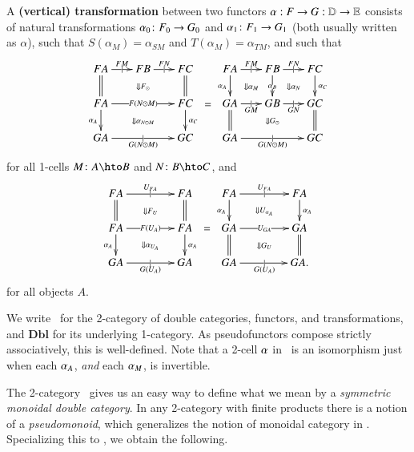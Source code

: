 \documentclass{amsart}
\begin{document}
\begin{defn}\label{thm:dbl-transf}
  A \textbf{(vertical) transformation} between two functors $\alpha:
  F\to G:\mathbb{D}\to\mathbb{E}$ consists of natural transformations $\alpha_0\colon
  F_0\to G_0$ and $\alpha_1\colon F_1\to G_1$ (both usually written as
  $\alpha$), such that $S(\alpha_{M}) = \alpha_{SM}$ and
  $T(\alpha_{M}) = \alpha_{TM}$, and such that
  \[\vcenter{\xymatrix@-.5pc{
      FA \ar@{=}[d] \ar[r]|{|}^{FM}
      \ar@{}[drr]|{\Downarrow F_\odot} &
      FB \ar[r]|{|}^{FN} &
      FC \ar@{=}[d]\\
      FA \ar[rr]|{F(N\odot M)} \ar[d]_{\alpha_A}
      \ar@{}[drr]|{\Downarrow \alpha_{N\odot M}} &&
      FC \ar[d]^{\alpha_C}\\
      GA \ar[rr]|{|}_{G(N\odot M)} && GC
    }} =
  \vcenter{\xymatrix@-.5pc{
      FA \ar[d]_{\alpha_A} \ar@{}[dr]|{\Downarrow \alpha_M} \ar[r]|{|}^{FM} &
      FB \ar[d]|{\alpha_B} \ar@{}[dr]|{\Downarrow \alpha_N} \ar[r]|{|}^{FN} &
      FC \ar[d]^{\alpha_C}\\
      GA \ar@{=}[d] \ar[r]|{|}_{GM} \ar@{}[drr]|{\Downarrow G_\odot} &
      GB \ar[r]|{|}_{GN} &
      GC \ar@{=}[d]\\
      GA \ar[rr]|{|}_{G(N\odot M)} && GC
    }}\]
  for all 1-cells $M\colon A\hto B$ and $N\colon B\hto C$, and
  \[\vcenter{\xymatrix@-.5pc{
      FA \ar[rr]|{|}^{U_{FA}} \ar@{=}[d]
      \ar@{}[drr]|{\Downarrow F_U} &&
      FA \ar@{=}[d]\\
      FA \ar[rr]|{F(U_A)} \ar[d]_{\alpha_A}
      \ar@{}[drr]|{\Downarrow \alpha_{U_A}} &&
      FA \ar[d]^{\alpha_A}\\
      GA \ar[rr]|{|}_{G(U_A)} && GA
    }} =
  \vcenter{\xymatrix@-.5pc{
      FA \ar[rr]|{|}^{U_{FA}} \ar[d]_{\alpha_A}
      \ar@{}[drr]|{\Downarrow U_{\alpha_A}} &&
      FA \ar[d]^{\alpha_A}\\
      GA \ar[rr]|{U_{GA}} \ar@{=}[d]
      \ar@{}[drr]|{\Downarrow G_U} &&
      GA \ar@{=}[d]\\
      GA \ar[rr]|{|}_{G(U_A)} && GA.
    }}\]
  for all objects $A$.
\end{defn}

We write \cDbl\ for the 2-category of double categories, functors, and
transformations, and $\mathbf{Dbl}$ for its underlying 1-category. As pseudofunctors compose strictly associatively, this is well-defined. Note that a 2-cell $\alpha$ in \cDbl\ is an isomorphism just when each
$\alpha_A$, \emph{and} each $\alpha_M$, is invertible.

The 2-category \cDbl\ gives us an easy way to define what we mean by a
\emph{symmetric monoidal double category}.  In any 2-category with
finite products there is a notion of a \emph{pseudomonoid}, which
generalizes the notion of monoidal category in \cCat.  Specializing
this to \cDbl, we obtain the following.
\end{document}
